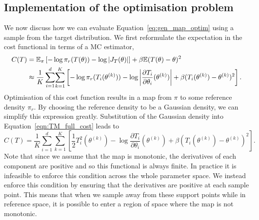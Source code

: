 \documentclass[final]{siamltex}
\begin{document}
\subsection{Implementation of the optimisation problem}\label{sec:transport_implementation}

We now discuss how we can evaluate Equation~\eqref{eq:gen_map_optim} using a sample from the target distribution. We first reformulate the expectation in the cost functional in terms of a MC estimator,
\begin{align}
	C(T) &= \mathbb{E}_\pi\left[ -\log\pi_r(T(\theta)) - \log|J_T(\theta)|\right] +
			\beta\mathbb{E}(T(\theta)-\theta)^2 \notag \\
		&\approx \frac{1}{K}\sum\limits_{i=1}^d \! \sum\limits_{k=1}^K \left[-\log\pi_r(T_i(\theta^{(k)})) -
			\log\left|\frac{\partial T_i}{\partial \theta_i}(\theta^{(k)})\right| + \beta(T_i(\theta^{(k)})-\theta^{(k)})^2\right]. \label{eqn:TM_full_cost}
\end{align}
Optimisation of this cost function results in a map from $\pi$ to some reference density $\pi_r$. By choosing the reference density to be a Gaussian density, we can simplify this expression greatly. Substitution of the Gaussian density into Equation~\eqref{eqn:TM_full_cost} leads to
\begin{equation}\label{eq:gauss_map_optim}
	C(T) = \frac{1}{K}\sum\limits_{i=1}^d \! \sum\limits_{k=1}^K \left[\frac{1}{2}
		T_i^2(\theta^{(k)}) - \log\frac{\partial T_i}{\partial \theta_i}(\theta^{(k)}) +
		\beta(T_i(\theta^{(k)})-\theta^{(k)})^2\right].
\end{equation}
Note that since we assume that the map is monotonic, the derivatives of each component are
positive and so this functional is always finite. In practice it is infeasible to enforce this condition across the whole parameter space. We instead enforce this condition by ensuring that the derivatives are positive at each sample point. This means that when we sample away from these support points while in reference space, it is possible to enter a region of space where the map is not monotonic.
\end{document}

